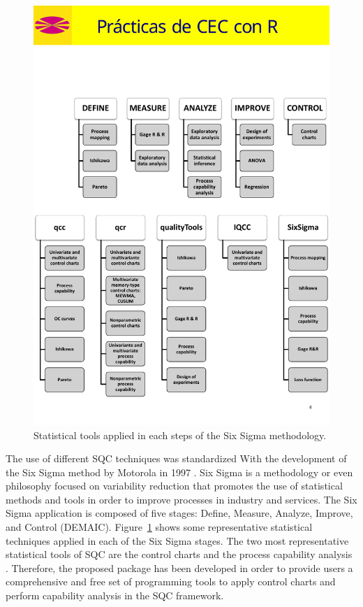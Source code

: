 \begin{figure}[h!]
		\centering	\includegraphics[width=1\linewidth]{DEMAIC.PDF}
        \caption{Statistical tools applied in each steps of the Six Sigma methodology.}
        \label{DMAIC}
	\end{figure}
    
The use of different SQC techniques was standardized With the development of the Six Sigma method by Motorola in 1997 \citep{pande2000six}. Six Sigma is a methodology or even philosophy focused on variability reduction that promotes the use of statistical methods and tools in order to improve processes in industry and services. %
The Six Sigma application is composed of five stages: Define, Measure, Analyze, Improve, and Control (DEMAIC). 
Figure~\ref{DMAIC} shows some representative statistical techniques applied in each of the Six Sigma stages. The two most representative statistical tools of SQC are the control charts and the process capability analysis \citep{montgomery2009introduction}. Therefore, the proposed  package has been developed in order to provide users a comprehensive and free set of programming tools to apply control charts and perform capability analysis in the SQC framework.
\\

